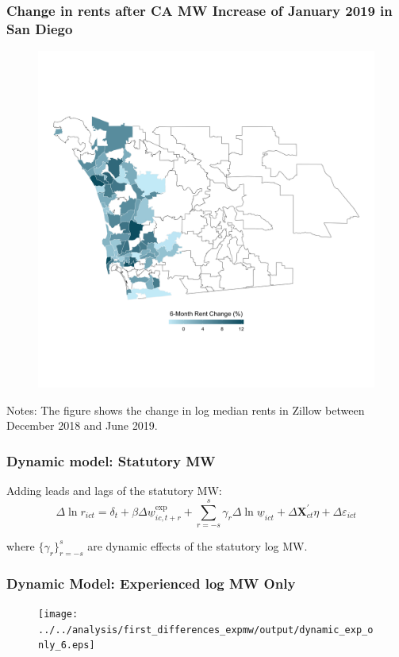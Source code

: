 \begin{frame}[label=san_diego_rents]
	\frametitle{Change in rents after CA MW Increase of January 2019 in San Diego}
	
	\hyperlink{san_diego_mw}{}
	\vspace{-7mm}
	\begin{figure} \centering
		\includegraphics[width = .48\textwidth]
			{../../analysis/descriptive_maps/output/San_Diego_rent_msa.png}
	\end{figure}
	\vspace{-7.5mm}
	\begin{minipage}{0.95\textwidth} \scriptsize
		Notes: The figure shows the change in log median rents in Zillow between December 
		2018 and June 2019.
	\end{minipage}
\end{frame}

\begin{frame}[label = dyn_alt_model]
	\frametitle{Dynamic model: Statutory MW}
	
	Adding leads and lags of the statutory MW:
	$$
	\Delta \ln r_{ict} = \delta_t
	+ \beta \Delta \underline{w}^{\text{exp}}_{ic,t+r}
	+ \sum_{r=-s}^{s} \gamma_r \Delta \ln \underline{w}_{ict}
	+ \Delta \mathbf{X}^{'}_{ct}\eta
	+ \Delta \varepsilon_{ict}
	$$
	
	where $\{\gamma_r\}_{r=-s}^{s}$ are dynamic effects of the statutory log MW.
	
	\vspace{2mm}
	\hyperlink{dyn_model}{}
\end{frame}

\begin{frame}[label = dyn_experienced_only]
	\frametitle{Dynamic Model: Experienced log MW Only}
	\begin{figure} \centering
		\texttt{[image: ../../analysis/first\_differences\_expmw/output/dynamic\_exp\_only\_6.eps]}
	\end{figure}

	\vspace{-2mm}
	\hyperlink{dyn_stat_only}{}
\end{frame}

